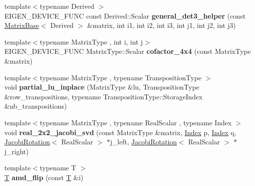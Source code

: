 \begin{DoxyCompactItemize}
{\footnotesize template$<$typename Derived $>$ }\\E\+I\+G\+E\+N\+\_\+\+D\+E\+V\+I\+C\+E\+\_\+\+F\+U\+NC const Derived\+::\+Scalar {\bfseries general\+\_\+det3\+\_\+helper} (const \hyperlink{group___core___module_class_eigen_1_1_matrix_base}{Matrix\+Base}$<$ Derived $>$ \&matrix, int i1, int i2, int i3, int j1, int j2, int j3)
\item 
\mbox{\label{namespace_eigen_1_1internal_a59da7796f5fabd3f99a7af0c5c3b6e74}} 
{\footnotesize template$<$typename Matrix\+Type , int i, int j$>$ }\\E\+I\+G\+E\+N\+\_\+\+D\+E\+V\+I\+C\+E\+\_\+\+F\+U\+NC Matrix\+Type\+::\+Scalar {\bfseries cofactor\+\_\+4x4} (const Matrix\+Type \&matrix)
\item 
\mbox{\label{namespace_eigen_1_1internal_a6631a201f1f0e9f43f5458478d30fa63}} 
{\footnotesize template$<$typename Matrix\+Type , typename Transposition\+Type $>$ }\\void {\bfseries partial\+\_\+lu\+\_\+inplace} (Matrix\+Type \&lu, Transposition\+Type \&row\+\_\+transpositions, typename Transposition\+Type\+::\+Storage\+Index \&nb\+\_\+transpositions)
\item 
\mbox{\label{namespace_eigen_1_1internal_a6c2651dd28bd9227267e66aaca20330e}} 
{\footnotesize template$<$typename Matrix\+Type , typename Real\+Scalar , typename Index $>$ }\\void {\bfseries real\+\_\+2x2\+\_\+jacobi\+\_\+svd} (const Matrix\+Type \&matrix, \hyperlink{namespace_eigen_a62e77e0933482dafde8fe197d9a2cfde}{Index} p, \hyperlink{namespace_eigen_a62e77e0933482dafde8fe197d9a2cfde}{Index} q, \hyperlink{group___jacobi___module_class_eigen_1_1_jacobi_rotation}{Jacobi\+Rotation}$<$ Real\+Scalar $>$ $\ast$j\+\_\+left, \hyperlink{group___jacobi___module_class_eigen_1_1_jacobi_rotation}{Jacobi\+Rotation}$<$ Real\+Scalar $>$ $\ast$j\+\_\+right)
\item 
\mbox{\label{namespace_eigen_1_1internal_a72134691e35594dbae02d69a0c5170fa}} 
{\footnotesize template$<$typename T $>$ }\\\hyperlink{group___sparse_core___module}{T} {\bfseries amd\+\_\+flip} (const \hyperlink{group___sparse_core___module}{T} \&i)
\item 

\end{DoxyCompactItemize}
